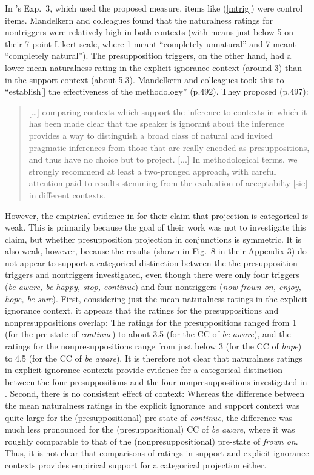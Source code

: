 \documentclass[11pt,fleqn]{article}
\newcommand{\6}{\mbox{$[\hspace*{-.6mm}[$}}
\newcommand{\9}{\mbox{$]\hspace*{-.6mm}]$}}
\newcommand{\citepos}[1]{\citeauthor{#1}'s \citeyear{#1}}
\begin{document}
In \citepos{mandelkern-etal2020} Exp.~3, which used the proposed measure, items like (\ref{mtrig}) were control items. Mandelkern and colleagues found that the naturalness ratings for nontriggers were relatively high in both contexts (with means just below 5 on their 7-point Likert scale, where 1 meant ``completely unnatural'' and 7 meant ``completely natural''). The presupposition triggers, on the other hand, had a lower mean naturalness rating in the explicit ignorance context (around 3) than in the support context (about 5.3). Mandelkern and colleagues took this to ``establish[] the effectiveness of the methodology'' (p.492). They proposed (p.497):

\begin{quote}

[\ldots] comparing contexts which support the inference to contexts in which it has been made clear that the speaker is ignorant about the inference provides a way to distinguish a broad class of natural and invited pragmatic inferences from those that are really encoded as presuppositions, and thus have no choice but to project. [...]  In methodological terms, we strongly recommend at least a two-pronged approach, with careful attention paid to results stemming from the evaluation of acceptabilty [sic] in different contexts.

\end{quote}

However, the empirical evidence in \citealt{mandelkern-etal2020} for their claim that projection is categorical is weak. This is primarily because the goal of their work was not to investigate this claim, but whether presupposition projection in conjunctions is symmetric. It is also weak, however, because the results (shown in Fig.~8 in their Appendix 3) do not appear to support a categorical distinction between the the presupposition triggers and nontriggers investigated, even though there were only four triggers ({\em be aware, be happy, stop, continue}) and four nontriggers ({\em now frown on, enjoy, hope, be sure}).  First, considering just the mean naturalness ratings in the explicit ignorance context, it appears that the ratings for the presuppositions and nonpresuppositions overlap: The ratings for the presuppositions ranged from 1 (for the pre-state of {\em continue}) to about 3.5 (for the CC of {\em be aware}), and the ratings for the nonpresuppositions range from just below 3 (for the CC of {\em hope}) to 4.5 (for the CC of {\em be aware}). It is therefore not clear that naturalness ratings in explicit ignorance contexts provide evidence for a categorical distinction between the four presuppositions and the four nonpresuppositions investigated in \citealt{mandelkern-etal2020}. Second, there is no consistent effect of context: Whereas the difference between the mean naturalness ratings in the explicit ignorance and support context was quite large for the (presuppositional) pre-state of {\em continue}, the difference was much less pronounced for the (presuppositional) CC of {\em be aware}, where it was roughly comparable to that of the (nonpresuppositional) pre-state of {\em frown on}. Thus, it is not clear that comparisons of ratings in support and explicit ignorance contexts provides empirical support for a categorical projection either. 
\end{document}
